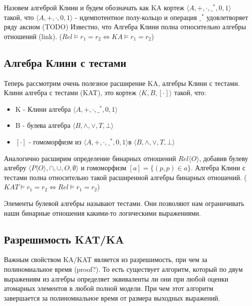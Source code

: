 \documentclass[times
              ]{itmo-student-thesis}
\begin{document}
      Назовем алгеброй Клини и будем обозначать как KA кортеж $\langle A,+,\cdot,\_^*,0,1\rangle$ такой, что $\langle A, +, \cdot, 0, 1 \rangle$ - идемпотентное полу-кольцо и операция $ \_^* $ удовлетворяет ряду аксиом (TODO)
      Известно, что Алгебра Клини полна относительно алгебры отношений (link).
      ($ Rel \models r_1 = r_2 \Leftrightarrow KA \models r_1 = r_2$)

    \subsection{Алгебра Клини с тестами}
      Теперь рассмотрим очень полезное расширение KA, алгебры Клини с тестами.
      Клини алгебра с тестами (KAT), это кортеж $\langle K, B, [\cdot] \rangle$ такой, что:

      \begin{itemize}
        \item K - Клини алгебра $\langle A, +, \cdot, \_^*, 0, 1 \rangle $
        \item B - булева алгебра $\langle B, \wedge, \vee, T, \bot \rangle $
        \item $ [\cdot] $ - гомоморфизм из $\langle A, +, \cdot, \_^*, 0, 1 \rangle  $в $\langle B, \wedge, \vee, T, \bot \rangle$
      \end{itemize}

      Аналогично расширим определение бинарных отношений $Rel \langle O \rangle $, добавив булеву алгебру $\langle P\langle O \rangle, \cap, \cup, O, \emptyset \rangle$ и гомоморфизм $ [a] = \{(p, p) \in a\} $.
      Алгебра Клини с тестами полна относительно такой расширенной алгебры бинарных отношений.
      ($KAT \models r_1 = r_2 \Leftrightarrow Rel \models r_1 = r_2$)

      Элементы булевой алгебры называют тестами. Они позволяют нам ограничивать наши бинарные отношения какими-то логическими выражениями.

    \subsection{Разрешимость KAT/KA}
      Важным свойством KA/KAT является из разрешимость, при чем за полиномиальное время (proof?). То есть существует алгоритм, который по двум выражениям из алгебры определяет эквиваленты ли они при любой оценки атомарных элементов в любой полной модели. При чем этот алгоритм завершается за полиномиальное время от размера выходных выражений.
\end{document}
